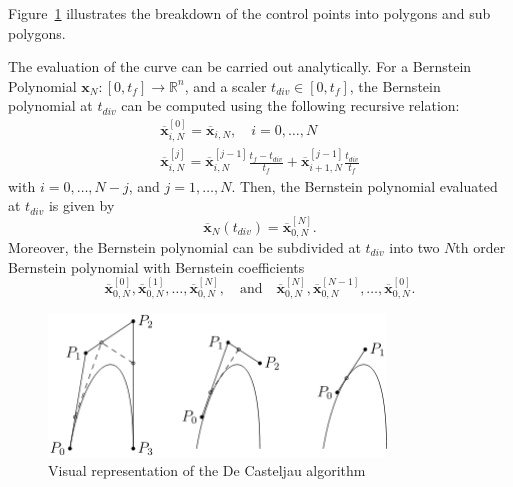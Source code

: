 Figure~\ref{fig:deCasteljau} illustrates the breakdown of the control points into polygons and sub polygons. 
\par The evaluation of the curve can be carried out analytically. For a Bernstein Polynomial $\boldsymbol{x}_N:[0,t_f]\rightarrow \mathbb{R}^n$, and a scaler $t_{div}\in [0,t_f]$, the Bernstein polynomial at $t_{div}$ can be computed using the following recursive relation:
\begin{equation}
\begin{gathered}
    \overline{\boldsymbol{x}}^{[0]}_{i,N} = \overline{\boldsymbol{x}}_{i,N},\quad i=0,\dots, N  \\
    \overline{\boldsymbol{x}}^{[j]}_{i,N} = \overline{\boldsymbol{x}}^{[j-1]}_{i,N} \frac{t_f-t_{div}}{t_f} + \overline{\boldsymbol{x}}^{[j-1]}_{i+1,N} \frac{t_{div}}{t_f}
\end{gathered}
\end{equation}
with $i=0,\dots, N-j$, and $j=1,\dots, N$. Then, the Bernstein polynomial evaluated at $t_{div}$ is given by
\begin{equation}
    \overline{\boldsymbol{x}}_N(t_{div}) = \overline{\boldsymbol{x}}_{0,N}^{[N]}.
\end{equation}
Moreover, the Bernstein polynomial can be subdivided at $t_{div}$ into two $N$th order Bernstein polynomial with Bernstein coefficients
\begin{equation}
    \overline{\boldsymbol{x}}^{[0]}_{0,N}, \overline{\boldsymbol{x}}^{[1]}_{0,N}, \dots, \overline{\boldsymbol{x}}^{[N]}_{0,N}, \quad \text{and}\quad \overline{\boldsymbol{x}}^{[N]}_{0,N}, \overline{\boldsymbol{x}}^{[N-1]}_{0,N}, \dots, \overline{\boldsymbol{x}}^{[0]}_{0,N}.
\end{equation}

\begin{figure}[h!]
\centering
\includegraphics[width=0.8\textwidth]{Images/deCasteljau.png}
\caption{Visual representation of the De Casteljau algorithm}
\label{fig:deCasteljau}
\end{figure}

